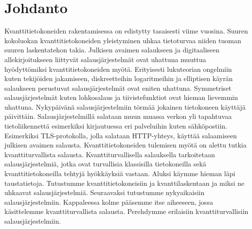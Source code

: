 \chapter{Johdanto\label{intro}}
Kvanttitietokoneiden rakentamisessa on edistytty tasaisesti viime vuosina. Suuren kokoluokan kvanttitietokoneiden yleistyminen uhkaa tietoturvaa niiden tuoman suuren laskentatehon takia. Julkisen avaimen salaukseen ja digitaaliseen allekirjoitukseen liittyvät salausjärjestelmät ovat uhattuna muuttua hyödyttömiksi kvanttitietokoneiden myötä. Erityisesti lukuteorian ongelmiin kuten tekijöiden jakamiseen, diskreetteihin logaritmeihin ja elliptisen käyrän salaukseen perustuvat salausjärjestelmät ovat eniten uhattuna. Symmetriset salausjärjestelmät kuten lohkosalaus ja tiivistefunktiot ovat hieman lievemmin uhattuna. Nykypäivänä salausjärjestelmiin törmää jokainen tietokoneen käyttäjä päivittäin. Salausjärjestelmillä salataan muun muassa verkon yli tapahtuvaa tietoliikennettä esimerkiksi kirjautuessa eri palveluihin kuten sähköpostiin. Esimerkiksi TLS-protokolla, jolla salataan HTTP-yhteys, käyttää salaamiseen julkisen avaimen salausta. Kvanttitietokoneiden tulemisen myötä on alettu tutkia kvanttiturvallista salausta. Kvanttiturvallisella salauksella tarkoitetaan salausjärjestelmiä, jotka ovat turvallisia klassisilla tietokoneilla sekä kvanttitietokoneilla tehtyjä hyökkäyksiä vastaan. Aluksi käymme hieman läpi taustatietoja. Tutustumme kvanttitietokoneisiin ja kvanttilaskentaan ja miksi ne uhkaavat salausjärjestelmiä. Seuraavaksi tutustumme nykyaikaisiin salausjärjestelmiin. Kappaleessa kolme pääsemme itse aiheeseen, jossa käsittelemme kvanttiturvallista salausta. Perehdymme erilaisiin kvanttiturvallisiin salausjärjestelmiin.